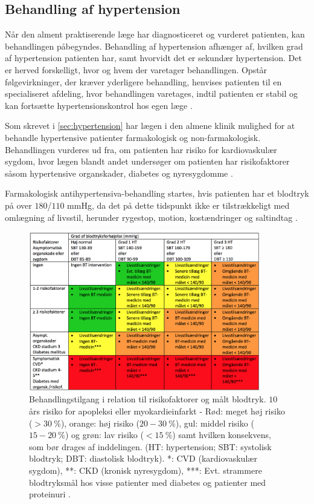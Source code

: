 \subsection{Behandling af hypertension}

Når den alment praktiserende læge har diagnosticeret og vurderet patienten, kan behandlingen påbegyndes. Behandling af hypertension afhænger af, hvilken grad af hypertension patienten har, samt hvorvidt det er sekundær hypertension. Det er herved forskelligt, hvor og hvem der varetager behandlingen. Opstår følgevirkninger, der kræver yderligere behandling, henvises patienten til en specialiseret afdeling, hvor behandlingen varetages, indtil patienten er stabil og kan fortsætte hypertensionskontrol hos egen læge \citep{sundhedsstyrelsen2010}.

Som skrevet i \autoref{sec:hypertension} har lægen i den almene klinik mulighed for at behandle hypertensive patienter farmakologisk og non-farmakologisk. Behandlingen vurderes ud fra, om patienten har risiko for kardiovaskulær sygdom, hvor lægen blandt andet undersøger om patienten har risikofaktorer såsom hypertensive organskader, diabetes og nyresygdomme \citep{promedicin2016}.

Farmakologisk antihypertensiva-behandling startes, hvis patienten har et blodtryk på over $180$/$110$ mmHg, da det på dette tidspunkt ikke er tilstrækkeligt med omlægning af livsstil, herunder rygestop, motion, kostændringer og saltindtag \citep{pedersen2016, bech2015}. 

\begin{figure}[H]
\centering
\includegraphics[width=0.9\textwidth]{figures/behandlingsvejl}
\caption{Behandlingstilgang i relation til risikofaktorer og målt blodtryk. $10$ års risiko for apopleksi eller myokardieinfarkt - Rød: meget høj risiko ($>30~\%$), orange: høj risiko ($20-30~\%$), gul: middel risiko ($15-20~\%$) og grøn: lav risiko ($<15~\%$) samt hvilken konsekvens, som bør drages af inddelingen. (HT: hypertension; SBT: systolisk blodtryk; DBT: diastolisk blodtryk). *: CVD (kardiovaskulær sygdom), **: CKD (kronisk nyresygdom), ***: Evt. strammere blodtryksmål hos visse patienter med diabetes og patienter med proteinuri \citep{bech2015}.}
\label{fig:behandlingsvejl}
\end{figure}

